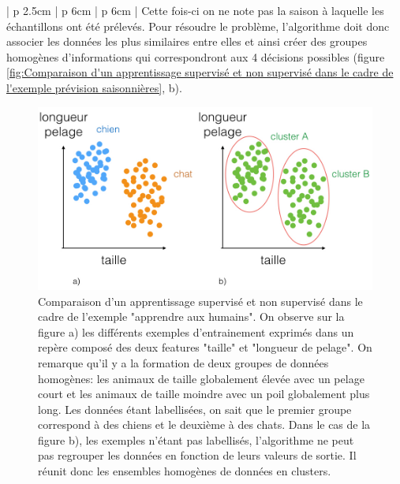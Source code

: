 \begin{table}[H]
\begin{tabular}{ | p {2.5cm} | p {6cm} | p {6cm} |}
	Cette fois-ci on ne note pas la saison à laquelle les échantillons ont été prélevés. Pour résoudre le problème, l'algorithme doit donc associer les données les plus similaires entre elles et ainsi créer des groupes homogènes d'informations qui correspondront aux 4 décisions possibles (figure \ref{fig:Comparaison d'un apprentissage supervisé et non supervisé dans le cadre de l'exemple prévision saisonnières}, b). \\
	\hline
	\end{tabular}
	\caption[Comparaison des différents modèles d'apprentissage]{Comparaison de l'apprentissage supervisé et non supervisé par des exemples}
	\label {tab: Comparaison des différentes méthodes d'apprentissage}
\end{table}

\begin{figure}[H]
	\centering\includegraphics[width=13cm]{images/apprentissage_chat.jpeg}
	\caption[Comparaison d'un apprentissage supervisé et non supervisé dans le cadre de l'exemple "apprendre aux humains"]{Comparaison d'un apprentissage supervisé et non supervisé dans le cadre de l'exemple "apprendre aux humains". On observe sur la figure a) les différents exemples d'entrainement exprimés dans un repère composé des deux features "taille" et "longueur de pelage". On remarque qu'il y a la formation de deux groupes de données homogènes: les animaux de taille globalement élevée avec un pelage court et les animaux de taille moindre avec un poil globalement plus long. Les données étant labellisées, on sait que le premier groupe correspond à des chiens et le deuxième à des chats. Dans le cas de la figure b), les exemples n'étant pas labellisés, l'algorithme ne peut pas regrouper les données en fonction de leurs valeurs de sortie. Il réunit donc les ensembles homogènes de données en clusters.}
	\label{fig:Comparaison d'un apprentissage supervisé et non supervisé dans le cadre de l'exemple "apprendre aux humains"}
\end{figure}

